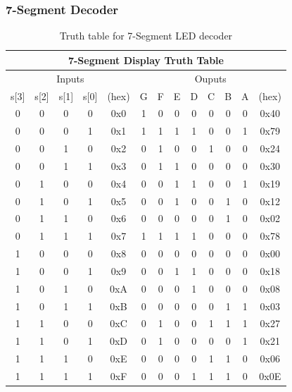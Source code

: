 \documentclass[11pt]{article}
\begin{document}
\subsubsection{7-Segment Decoder}
\label{sec:software_7seg}

\begin{table}[h]
\centering
\begin{tabular}{|c|c|c|c|c|c|c|c|c|c|c|c|c|}
\hline
\multicolumn{13}{|c|}{7-Segment Display Truth Table}                                  \\ \hline
\multicolumn{5}{|c|}{Inputs}                      & \multicolumn{8}{c|}{Ouputs}       \\ \hline
s{[}3{]} & s{[}2{]} & s{[}1{]} & s{[}0{]} & (hex) & G & F & E & D & C & B & A & (hex) \\ \hline
0        & 0        & 0        & 0        & 0x0   & 1 & 0 & 0 & 0 & 0 & 0 & 0 & 0x40  \\ \hline
0        & 0        & 0        & 1        & 0x1   & 1 & 1 & 1 & 1 & 0 & 0 & 1 & 0x79  \\ \hline
0        & 0        & 1        & 0        & 0x2   & 0 & 1 & 0 & 0 & 1 & 0 & 0 & 0x24  \\ \hline
0        & 0        & 1        & 1        & 0x3   & 0 & 1 & 1 & 0 & 0 & 0 & 0 & 0x30  \\ \hline
0        & 1        & 0        & 0        & 0x4   & 0 & 0 & 1 & 1 & 0 & 0 & 1 & 0x19  \\ \hline
0        & 1        & 0        & 1        & 0x5   & 0 & 0 & 1 & 0 & 0 & 1 & 0 & 0x12  \\ \hline
0        & 1        & 1        & 0        & 0x6   & 0 & 0 & 0 & 0 & 0 & 1 & 0 & 0x02  \\ \hline
0        & 1        & 1        & 1        & 0x7   & 1 & 1 & 1 & 1 & 0 & 0 & 0 & 0x78  \\ \hline
1        & 0        & 0        & 0        & 0x8   & 0 & 0 & 0 & 0 & 0 & 0 & 0 & 0x00  \\ \hline
1        & 0        & 0        & 1        & 0x9   & 0 & 0 & 1 & 1 & 0 & 0 & 0 & 0x18  \\ \hline
1        & 0        & 1        & 0        & 0xA   & 0 & 0 & 0 & 1 & 0 & 0 & 0 & 0x08  \\ \hline
1        & 0        & 1        & 1        & 0xB   & 0 & 0 & 0 & 0 & 0 & 1 & 1 & 0x03  \\ \hline
1        & 1        & 0        & 0        & 0xC   & 0 & 1 & 0 & 0 & 1 & 1 & 1 & 0x27  \\ \hline
1        & 1        & 0        & 1        & 0xD   & 0 & 1 & 0 & 0 & 0 & 0 & 1 & 0x21  \\ \hline
1        & 1        & 1        & 0        & 0xE   & 0 & 0 & 0 & 0 & 1 & 1 & 0 & 0x06  \\ \hline
1        & 1        & 1        & 1        & 0xF   & 0 & 0 & 0 & 1 & 1 & 1 & 0 & 0x0E  \\ \hline
\end{tabular}
\caption{Truth table for 7-Segment LED decoder}
\label{table:7seg_decoder}
\end{table}
\end{document}
